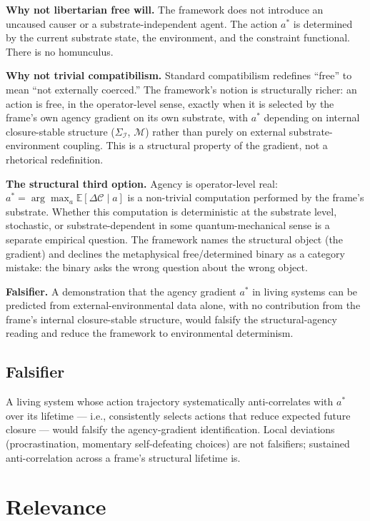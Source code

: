 \documentclass[11pt]{article}
\theoremstyle{plain}
\theoremstyle{definition}
\theoremstyle{remark}
\newcommand{\Ical}{\mathcal{I}}
\newcommand{\Ccal}{\mathcal{C}}
\newcommand{\Mcal}{\mathcal{M}}
\begin{document}
\textbf{Why not libertarian free will.} The framework does not introduce an uncaused causer or a substrate-independent agent. The action $a^*$ is determined by the current substrate state, the environment, and the constraint functional. There is no homunculus.

\textbf{Why not trivial compatibilism.} Standard compatibilism redefines ``free'' to mean ``not externally coerced.'' The framework's notion is structurally richer: an action is free, in the operator-level sense, exactly when it is selected by the frame's own agency gradient on its own substrate, with $a^*$ depending on internal closure-stable structure ($\Sigma_\Ical$, $\Mcal$) rather than purely on external substrate-environment coupling. This is a structural property of the gradient, not a rhetorical redefinition.

\textbf{The structural third option.} Agency is operator-level real: $a^* = \arg\max_a \mathbb{E}[\Delta \Ccal \mid a]$ is a non-trivial computation performed by the frame's substrate. Whether this computation is deterministic at the substrate level, stochastic, or substrate-dependent in some quantum-mechanical sense is a separate empirical question. The framework names the structural object (the gradient) and declines the metaphysical free/determined binary as a category mistake: the binary asks the wrong question about the wrong object.

\textbf{Falsifier.} A demonstration that the agency gradient $a^*$ in living systems can be predicted from external-environmental data alone, with no contribution from the frame's internal closure-stable structure, would falsify the structural-agency reading and reduce the framework to environmental determinism.

\subsection{Falsifier}

A living system whose action trajectory systematically anti-correlates with $a^*$ over its lifetime --- i.e., consistently selects actions that reduce expected future closure --- would falsify the agency-gradient identification. Local deviations (procrastination, momentary self-defeating choices) are not falsifiers; sustained anti-correlation across a frame's structural lifetime is.

\section{Relevance}\label{sec:relevance}
\end{document}
